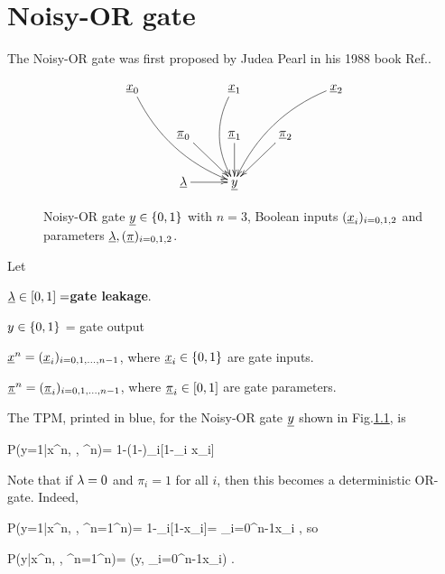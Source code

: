 \chapter{Noisy-OR gate}
The Noisy-OR gate was first
proposed by Judea Pearl in his 1988 book
 Ref.\cite{pearl-1988book}.
\begin{figure}[h!]
$$\xymatrix{
\rvx_0\ar@/_1pc/[ddrr]
&&\rvx_1\ar@/_1pc/[dd]
&&\rvx_2\ar@/_1pc/[ddll]
\\
&\ul{\pi}_0\ar[dr]
&\ul{\pi}_1\ar[d]
&\ul{\pi}_2\ar[dl]
\\
&\ul{\lam}\ar[r]
&\rvy
}$$
\caption{Noisy-OR gate ${\underline{y}}\in\{0,1\}$
with $n=3$, Boolean inputs $({\underline{x}}_i)_{i=0,1,2}$
and parameters 
$\underline{\lambda}, (\underline{\pi})_{i=0,1,2}$.
}
\label{fig-noisy-or-simple}
\end{figure}

Let

$\underline{\lambda}\in [0, 1]=${\bf gate leakage}.

$y\in \{0,1\}$ = gate  output

${\underline{x}}^n=({\underline{x}}_i)_{i=0,1, \ldots, n-1}$, where
${\underline{x}}_i\in\{0,1\}$ are
 gate inputs.

$\underline{\pi}^n=(\underline{\pi}_i)_{i=0,1, \ldots, n-1}$, where
$\underline{\pi}_i\in[0,1]$ are
 gate parameters.


The TPM, printed in blue,
 for the Noisy-OR gate ${\underline{y}}$ 
shown in Fig.\ref{fig-noisy-or-simple}, is

\beq\color{blue}
P(y=1|x^n, \lam, \pi^n)=
1-(1-\lam)\prod_i[1-\pi_i x_i]
\label{eq-noisy-or-tmp-1}
\eeq

Note
that if $\lambda=0$ and $\pi_i=1$ for all $i$,
then this becomes 
a deterministic OR-gate. Indeed,

\beq
P(y=1|x^n, , \pi^n=1^n)= 1-\prod_i[1-x_i]=
\V_{i=0}^{n-1}x_i
\;,
\eeq
so 

\beq
P(y|x^n, , \pi^n=1^n)=
\delta(y, \V_{i=0}^{n-1}x_i)
\;.
\eeq

